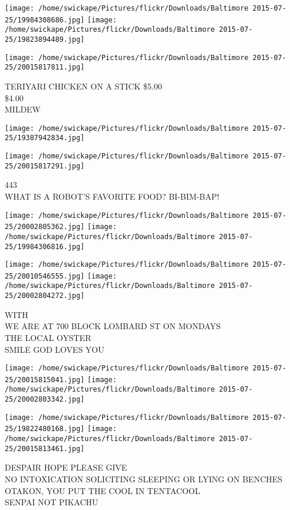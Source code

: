 \documentclass[10pt,letterpaper]{article}
\begin{document}
\texttt{[image: /home/swickape/Pictures/flickr/Downloads/Baltimore 2015-07-25/19984308686.jpg]}
\texttt{[image: /home/swickape/Pictures/flickr/Downloads/Baltimore 2015-07-25/19823894489.jpg]}

\texttt{[image: /home/swickape/Pictures/flickr/Downloads/Baltimore 2015-07-25/20015817811.jpg]}

TERIYARI CHICKEN ON A STICK \$5.00\\
\$4.00\\
MILDEW\\
\pagebreak

\texttt{[image: /home/swickape/Pictures/flickr/Downloads/Baltimore 2015-07-25/19387942834.jpg]}

\vspace{0.25in}
\texttt{[image: /home/swickape/Pictures/flickr/Downloads/Baltimore 2015-07-25/20015817291.jpg]}

443\\
WHAT IS A ROBOT'S FAVORITE FOOD?  BI{-}BIM{-}BAP!\\
\pagebreak

\texttt{[image: /home/swickape/Pictures/flickr/Downloads/Baltimore 2015-07-25/20002805362.jpg]}
\texttt{[image: /home/swickape/Pictures/flickr/Downloads/Baltimore 2015-07-25/19984306816.jpg]}

\texttt{[image: /home/swickape/Pictures/flickr/Downloads/Baltimore 2015-07-25/20010546555.jpg]}
\texttt{[image: /home/swickape/Pictures/flickr/Downloads/Baltimore 2015-07-25/20002804272.jpg]}

WITH\\
WE ARE AT 700 BLOCK LOMBARD ST ON MONDAYS\\
THE LOCAL OYSTER\\
SMILE GOD LOVES YOU\\
\pagebreak

\texttt{[image: /home/swickape/Pictures/flickr/Downloads/Baltimore 2015-07-25/20015815041.jpg]}
\texttt{[image: /home/swickape/Pictures/flickr/Downloads/Baltimore 2015-07-25/20002803342.jpg]}

\texttt{[image: /home/swickape/Pictures/flickr/Downloads/Baltimore 2015-07-25/19822480168.jpg]}
\texttt{[image: /home/swickape/Pictures/flickr/Downloads/Baltimore 2015-07-25/20015813461.jpg]}

DESPAIR HOPE PLEASE GIVE\\
NO INTOXICATION SOLICITING SLEEPING OR LYING ON BENCHES\\
OTAKON, YOU PUT THE COOL IN TENTACOOL\\
SENPAI NOT PIKACHU\\
\pagebreak
\end{document}
